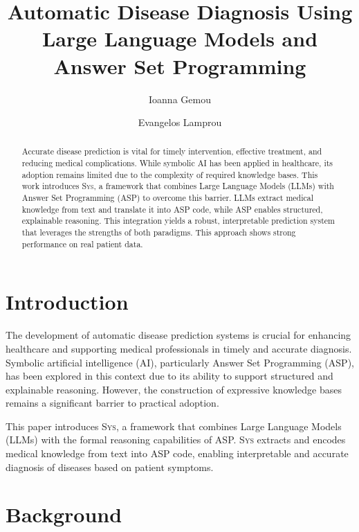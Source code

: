 \documentclass[10pt,leqno]{amsart}
\title{Automatic Disease Diagnosis Using Large Language Models and Answer Set Programming}
\author{
	Ioanna Gemou
	\and
	Evangelos Lamprou
}
\newcommand{\sys}{\textsc{Sys}\xspace}
\begin{document}
\maketitle
\begin{abstract}
Accurate disease prediction is vital for timely intervention, 
effective treatment, and reducing medical complications. 
While symbolic AI has been applied in healthcare, 
its adoption remains limited due to the complexity 
of required knowledge bases.
This work introduces \sys, a framework that combines Large Language Models (LLMs) 
with Answer Set Programming (ASP) to overcome this barrier. 
LLMs extract medical knowledge from text and translate it into ASP code, 
while ASP enables structured, explainable reasoning. 
This integration yields a robust, interpretable prediction system 
that leverages the strengths of both paradigms. 
This approach shows strong performance on real patient data.
\end{abstract}

\section{Introduction}

The development of automatic disease prediction systems 
is crucial for enhancing healthcare and supporting medical 
professionals in timely and accurate diagnosis. 
Symbolic artificial intelligence (AI), particularly Answer Set Programming (ASP), 
has been explored in this context due to its ability 
to support structured and explainable reasoning. 
However, the construction of expressive knowledge bases 
remains a significant barrier to practical adoption.

This paper introduces \sys, a framework 
that combines Large Language Models (LLMs) with the 
formal reasoning capabilities of ASP.
\sys extracts and encodes medical knowledge from text into ASP code,
enabling interpretable and accurate diagnosis 
of diseases based on patient symptoms. 

\section{Background}
\end{document}
